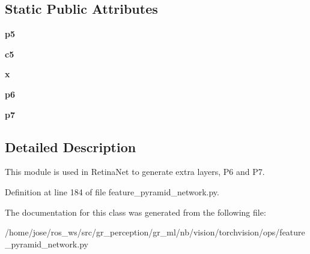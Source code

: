 \subsection*{Static Public Attributes}
\begin{DoxyCompactItemize}
\item 
\mbox{\label{classtorchvision_1_1ops_1_1feature__pyramid__network_1_1LastLevelP6P7_af732d85abec5e814fb17a23fca0b0951}} 
{\bfseries p5}
\item 
\mbox{\label{classtorchvision_1_1ops_1_1feature__pyramid__network_1_1LastLevelP6P7_a2c3a9c88706f4200dabe11fc894f4681}} 
{\bfseries c5}
\item 
\mbox{\label{classtorchvision_1_1ops_1_1feature__pyramid__network_1_1LastLevelP6P7_a4ada66ba35ba9d46a5753d0904027889}} 
{\bfseries x}
\item 
\mbox{\label{classtorchvision_1_1ops_1_1feature__pyramid__network_1_1LastLevelP6P7_aa2171916d3f95b31e287fa4af067a558}} 
{\bfseries p6}
\item 
\mbox{\label{classtorchvision_1_1ops_1_1feature__pyramid__network_1_1LastLevelP6P7_a48af8112bb2aabf3a31f37cb5611beb4}} 
{\bfseries p7}
\end{DoxyCompactItemize}


\subsection{Detailed Description}
\begin{DoxyVerb}This module is used in RetinaNet to generate extra layers, P6 and P7.
\end{DoxyVerb}
 

Definition at line 184 of file feature\+\_\+pyramid\+\_\+network.\+py.



The documentation for this class was generated from the following file\+:\begin{DoxyCompactItemize}
\item 
/home/jose/ros\+\_\+ws/src/gr\+\_\+perception/gr\+\_\+ml/nb/vision/torchvision/ops/feature\+\_\+pyramid\+\_\+network.\+py\end{DoxyCompactItemize}
